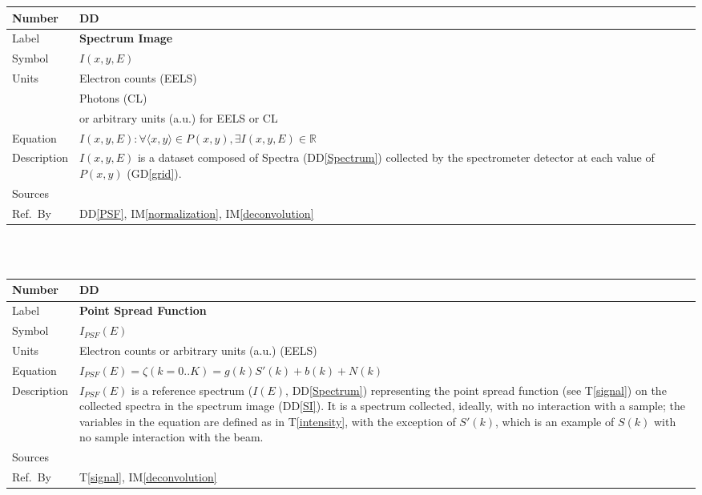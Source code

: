 \documentclass[12pt]{article}
\newcommand{\colAwidth}{0.13\textwidth}
\newcommand{\colBwidth}{0.82\textwidth}
\newcounter{defnum} %
\newcommand{\dref}[1]{GD\ref{#1}}
\newcounter{datadefnum} %
\newcommand{\ddref}[1]{DD\ref{#1}}
\newcommand{\tref}[1]{T\ref{#1}}
\newcommand{\iref}[1]{IM\ref{#1}}
\begin{document}
\noindent
\begin{minipage}{\textwidth}
\renewcommand*{\arraystretch}{1.5}
\begin{tabular}{| p{\colAwidth} | p{\colBwidth}|}
	\hline
	\rowcolor[gray]{0.9}
	Number& DD{datadefnum}\thedatadefnum \label{SI}\\
	\hline
	Label& \bf Spectrum Image\\
	\hline
	Symbol &$I(x, y, E)$\\
	\hline
	Units & Electron counts (EELS)\\
	& Photons (CL)\\
	& or arbitrary units (a.u.) for EELS or CL\\
	\hline
	Equation& $I(x, y, E): \forall \langle x, y \rangle \in P(x,y), \exists I(x,y,E) \in \mathbb{R}$\\
	\hline
	Description & $I(x, y, E)$ is a dataset composed of Spectra (\ddref{Spectrum}) collected by the spectrometer detector at each value of $P(x,y)$ (\dref{grid}).
	\\
	\hline
	Sources&~\cite{jeanguillaume_spectrum-image:_1989}  \\
	\hline
	Ref.\ By & \ddref{PSF}, \iref{normalization}, \iref{deconvolution}\\
	\hline
\end{tabular}
\end{minipage}\\

~\newline

\noindent
\begin{minipage}{\textwidth}
	\renewcommand*{\arraystretch}{1.5}
	\begin{tabular}{| p{\colAwidth} | p{\colBwidth}|}
		\hline
		\rowcolor[gray]{0.9}
		Number& DD{datadefnum}\thedatadefnum \label{PSF}\\
		\hline
		Label& \bf Point Spread Function\\
		\hline
		Symbol &$I_{PSF}(E)$\\
		\hline
		Units & Electron counts or arbitrary units (a.u.) (EELS)\\
		  \hline
		  Equation&$I_{PSF}(E) = \zeta(k={0..K}) = g(k) S'(k) + b(k) + N(k)$\\
		  \hline
		  Description & $I_{PSF}(E)$ is a reference spectrum ($I(E)$, \ddref{Spectrum}) representing the point spread function (see \tref{signal}) on the collected spectra in the spectrum image (\ddref{SI}). It is a spectrum collected, ideally, with no interaction with a sample; the variables in the equation are defined as in \tref{intensity}, with the exception of $S'(k)$, which is an example of $S(k)$ with no sample interaction with the beam.
		  \\
		  \hline
		  Sources&~\cite{zuo_electron_2000, jeanguillaume_spectrum-image:_1989, gloter_improving_2003}  \\
		  \hline
		  Ref.\ By & \tref{signal}, \iref{deconvolution}\\
		  \hline
	\end{tabular}
\end{minipage}\\
\end{document}
